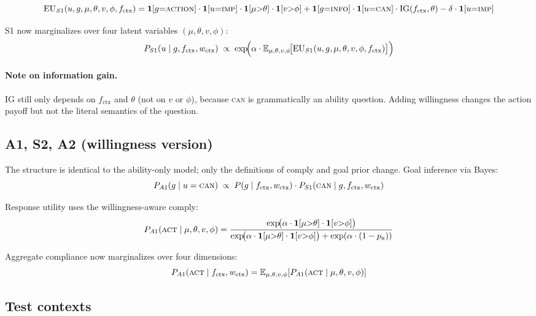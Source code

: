 \documentclass[11pt]{article}
\begin{document}
\[
  \mathrm{EU}_{S1}(u, g, \mu, \theta, v, \phi, f_{\text{ctx}}) =
  \mathbf{1}[g{=}\textsc{action}]\cdot\mathbf{1}[u{=}\textsc{imp}]\cdot\mathbf{1}[\mu{>}\theta]\cdot\mathbf{1}[v{>}\phi]
  + \mathbf{1}[g{=}\textsc{info}]\cdot\mathbf{1}[u{=}\textsc{can}]\cdot\mathrm{IG}(f_{\text{ctx}}, \theta)
  - \delta\cdot\mathbf{1}[u{=}\textsc{imp}]
\]

S1 now marginalizes over four latent variables $(\mu, \theta, v, \phi)$:
\[
  P_{S1}(u \mid g, f_{\text{ctx}}, w_{\text{ctx}}) \;\propto\;
  \exp\!\Bigl(\alpha\cdot
    \mathbb{E}_{\mu,\theta,v,\phi}\!\bigl[\mathrm{EU}_{S1}(u, g, \mu, \theta, v, \phi, f_{\text{ctx}})\bigr]
  \Bigr)
\]

\paragraph{Note on information gain.} IG still only depends on $f_{\text{ctx}}$ and
$\theta$ (not on $v$ or $\phi$), because \textsc{can} is grammatically an
ability question. Adding willingness changes the action payoff but not the
literal semantics of the question.

\subsection{A1, S2, A2 (willingness version)}

The structure is identical to the ability-only model; only the definitions of
comply and goal prior change. Goal inference via Bayes:
\[
  P_{A1}(g \mid u = \textsc{can}) \;\propto\; P(g \mid f_{\text{ctx}}, w_{\text{ctx}})\cdot P_{S1}(\textsc{can} \mid g, f_{\text{ctx}}, w_{\text{ctx}})
\]

Response utility uses the willingness-aware comply:
\[
  P_{A1}(\textsc{act} \mid \mu, \theta, v, \phi) =
  \frac{\exp\!\bigl(\alpha\cdot\mathbf{1}[\mu{>}\theta]\cdot\mathbf{1}[v{>}\phi]\bigr)}
       {\exp\!\bigl(\alpha\cdot\mathbf{1}[\mu{>}\theta]\cdot\mathbf{1}[v{>}\phi]\bigr) + \exp(\alpha\cdot(1-p_a))}
\]

Aggregate compliance now marginalizes over four dimensions:
\[
  P_{A1}(\textsc{act} \mid f_{\text{ctx}}, w_{\text{ctx}}) =
  \mathbb{E}_{\mu, \theta, v, \phi}\!\left[P_{A1}(\textsc{act} \mid \mu, \theta, v, \phi)\right]
\]

\subsection{Test contexts}
\end{document}
